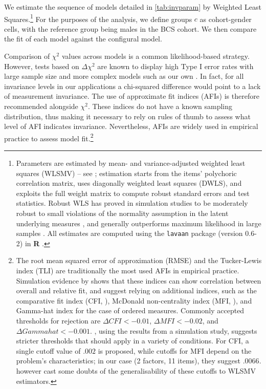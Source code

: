We estimate the sequence of models detailed in \autoref{tab:invparam} by Weighted Least Squares.\footnote{Parameters are estimated by mean- and variance-adjusted weighted least squares (WLSMV) -- see \citet{Muthen1997}; estimation starts from the items' polychoric correlation matrix, uses diagonally weighted least squares (DWLS), and exploits the full weight matrix to compute robust standard errors and test statistics. Robust WLS has proved in simulation studies to be moderately robust to small violations of the normality assumption in the latent underlying measures \citep{Flora2004}, and generally outperforms maximum likelihood in large samples \citep{Beauducel2006,Li2016}. All estimates are computed using the \texttt{lavaan} package (version 0.6-2) in \textbf{\textsf{R}} \citep{Rosseel2012}.}
For the purposes of the analysis, we define groups $c$ as cohort-gender cells, with the reference group being males in the BCS cohort. We then compare the fit of each model against the configural model.

Comparison of $\chi^2$ values across models is a common likelihood-based strategy. However, tests based on $\Delta \chi^2$ are known to display high Type I error rates with large sample size and more complex models such as our own \citep{Sass2014}. In fact, for all invariance levels in our applications a chi-squared difference would point to a lack of measurement invariance. The use of approximate fit indices (AFIs) is therefore recommended alongside $\chi^2$. These indices do not have a known sampling distribution, thus making it necessary to rely on rules of thumb to assess what level of \textDelta AFI indicates invariance. Nevertheless, AFIs are widely used in empirical practice to assess model fit.\footnote{The root mean squared error of approximation (RMSE) and the Tucker-Lewis index (TLI) are traditionally the most used AFIs in empirical practice. Simulation evidence by \citet{Cheung2002} shows that these indices can show correlation between overall and relative fit, and suggest relying on additional indices, such as the comparative fit index (CFI, \citealp{Bentler1990}), McDonald non-centrality index (MFI, \citealp{McDonald1989}), and Gamma-hat index \citep{Steiger1989} for the case of ordered measures. Commonly accepted thresholds for rejection are $\Delta CFI < - 0.01$, $\Delta MFI < - 0.02$, and $\Delta Gamma hat < - 0.001$. \citet{Meade2008}, using the results from a simulation study, suggests stricter thresholds that should apply in a variety of conditions. For CFI, a single cutoff value of $.002$ is proposed, while cutoffs for MFI depend on the problem's characteristics; in our case (2 factors, 11 items), they suggest $.0066$. \citet{Sass2014} however cast some doubts of the generalisability of these cutoffs to WLSMV estimators.}

